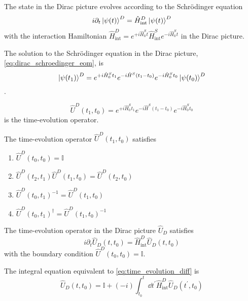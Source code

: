 \begin{lemma}\label{thm:dirac_schroedinger_eom}
	The state in the Dirac picture evolves according to the Schrödinger equation
	\begin{equation}
		i\partial_t
		\ket{\psi(t)}^D
		=
		\hat{H}_\text{int}^D
		\ket{\psi(t)}^D
		\label{eq:dirac_schroedinger_eom}
	\end{equation}
	with the interaction Hamiltonian $\hat{H}_\text{int}^D=e^{+i\hat{H}_0^St}\hat{H}_\text{int}^Se^{-i\hat{H}_0^St}$ in the Dirac picture.
\end{lemma}
\begin{theorem}
	The solution to the Schrödinger equation in the Dirac picture, \cref{eq:dirac_schroedinger_eom}, is
	\begin{equation}
		\ket{\psi(t_1)}^D
		=
		e^{+i\hat{H}_0^St_1}
		e^{-i\hat{H}^S(t_1-t_0)}
		e^{-i\hat{H}_0^St_0}
		\ket{\psi(t_0)}^D
	\end{equation}
	.
\end{theorem}
\begin{definition}
	\begin{equation}
		\hat{U}^D(t_1,t_0)
		=
		e^{+i\hat{H}_0^St_1}
		e^{-i\hat{H}^S(t_1-t_0)}
		e^{-i\hat{H}_0^St_0}		
	\end{equation}
	is the time-evolution operator.
\end{definition}
\begin{lemma}
	The time-evolution operator $\hat{U}^D(t_1,t_0)$ satisfies
	\begin{enumerate}
		\item $\hat{U}^D(t_0,t_0)=\mathbb{I}$
		\item $\hat{U}^D(t_2,t_1)\hat{U}^D(t_1,t_0)=\hat{U}^D(t_2,t_0)$
		\item $\hat{U}^D(t_0,t_1)^{-1}=\hat{U}^D(t_1,t_0)$
		\item $\hat{U}^D(t_0,t_1)^\dagger=\hat{U}^D(t_1,t_0)^{-1}$
	\end{enumerate}
\end{lemma}
\begin{corollary}
	The time-evolution operator in the Dirac picture $\hat{U}_D$ satisfies
	\begin{equation}
		i\partial_t
		\hat{U}_D(t,t_0)
		=
		\hat{H}^D_\text{int}
		\hat{U}_D(t,t_0)
		\label{eq:time_evolution_diff}
	\end{equation}
	with the boundary condition $\hat{U}^D(t_0,t_0)=\mathbb{I}$.
\end{corollary}
\begin{lemma}\label{thm:time_evolution_int}
	The integral equation equivalent to \cref{eq:time_evolution_diff} is
	\begin{equation}
		\hat{U}_D(t,t_0)
		=
		\mathbb{I}
		+
		(-i)
		\int_{t_0}^t\dd{t^\prime}
		\hat{H}_\text{int}^D
		\hat{U}_D(t^\prime,t_0)
		\label{eq:time_evolution_int}
	\end{equation}
\end{lemma}
